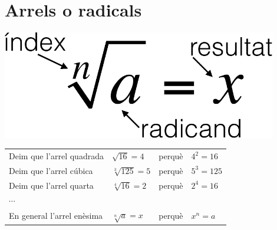 \pagebreak
\section{Arrels o radicals}

\begin{theorybox}
	\begin{minipage}{0.35\textwidth}
		\centering
	\end{minipage}
\begin{minipage}{0.35\textwidth}
	\centering
\end{minipage}
\begin{minipage}{0.2\textwidth}
	\centering
	\includegraphics[width=0.9\textwidth]{img-02/radical}
\end{minipage}

\begin{center}
\begin{tabular}{llll}
Deim que l'arrel quadrada & $\sqrt{16}=4$ & perquè & $4^2 = 16$ \\
Deim que l'arrel cúbica  & $\sqrt[3]{125}=5$& perquè& $5^3 = 125$\\
Deim que l'arrel quarta  & $\sqrt[4]{16}=2$ &perquè& $2^4 = 16$\\
$\cdots$ & & & \\
En general l'arrel enèsima &$\sqrt[n]{a}=x$& perquè &$x^n = a$
\end{tabular}
\end{center}
\end{theorybox}

